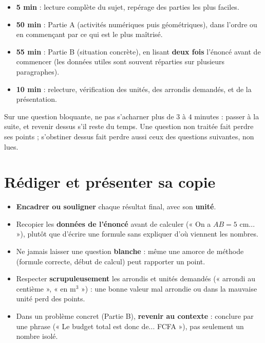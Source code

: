 \begin{propriete}
\begin{itemize}
\item \textbf{5 min} : lecture complète du sujet, repérage des parties les plus faciles.
\item \textbf{50 min} : Partie A (activités numériques puis géométriques), dans l'ordre ou
en commençant par ce qui est le plus maîtrisé.
\item \textbf{55 min} : Partie B (situation concrète), en lisant \textbf{deux fois}
l'énoncé avant de commencer (les données utiles sont souvent réparties sur plusieurs
paragraphes).
\item \textbf{10 min} : relecture, vérification des unités, des arrondis demandés, et de la
présentation.
\end{itemize}
\end{propriete}

\begin{remarque}
Sur une question bloquante, ne pas s'acharner plus de $3$ à $4$ minutes : passer à la
suite, et revenir dessus s'il reste du temps. Une question non traitée fait perdre ses
points ; s'obstiner dessus fait perdre aussi ceux des questions suivantes, non lues.
\end{remarque}

\section{Rédiger et présenter sa copie}

\begin{propriete}
\begin{itemize}
\item \textbf{Encadrer ou souligner} chaque résultat final, avec son \textbf{unité}.
\item Recopier les \textbf{données de l'énoncé} avant de calculer (« On a $AB=5$ cm... »),
plutôt que d'écrire une formule sans expliquer d'où viennent les nombres.
\item Ne jamais laisser une question \textbf{blanche} : même une amorce de méthode
(formule correcte, début de calcul) peut rapporter un point.
\item Respecter \textbf{scrupuleusement} les arrondis et unités demandés (« arrondi au
centième », « en m$^{3}$ ») : une bonne valeur mal arrondie ou dans la mauvaise unité perd
des points.
\item Dans un problème concret (Partie B), \textbf{revenir au contexte} : conclure par une
phrase (« Le budget total est donc de... FCFA »), pas seulement un nombre isolé.
\end{itemize}
\end{propriete}

